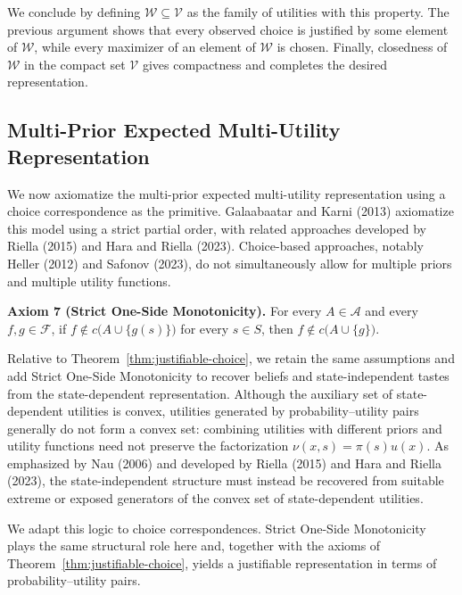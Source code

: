 \documentclass[11pt]{article}
\begin{document}
We conclude by defining $\mathcal W\subseteq\mathcal V$ as the family of utilities with this property. The previous argument shows that every observed choice is justified by some element of $\mathcal W$, while every maximizer of an element of $\mathcal W$ is chosen. Finally, closedness of $\mathcal W$ in the compact set $\mathcal V$ gives compactness and completes the desired representation.

\subsection{Multi-Prior Expected Multi-Utility Representation}

We now axiomatize the multi-prior expected multi-utility representation
using a choice correspondence as the primitive. Galaabaatar and Karni
(2013) axiomatize this model using a strict partial order, with related
approaches developed by Riella (2015) and Hara and Riella (2023).
Choice-based approaches, notably Heller (2012) and Safonov (2023), do not
simultaneously allow for multiple priors and multiple utility functions.

\medskip
\noindent\textbf{Axiom 7 (Strict One-Side Monotonicity).} For every $A\in\mathcal{A}$ and every $f,g\in\mathcal{F}$, if $f\notin c\bigl(A\cup\{g(s)\}\bigr)$ for every $s\in S$, then $f\notin c\bigl(A\cup\{g\}\bigr)$.

\medskip
Relative to Theorem~\ref{thm:justifiable-choice}, we retain the same assumptions and add Strict One-Side
Monotonicity to recover beliefs and state-independent tastes from the
state-dependent representation. Although the auxiliary set of
state-dependent utilities is convex, utilities generated by
probability--utility pairs generally do not form a convex set: combining
utilities with different priors and utility functions need not preserve the
factorization $\nu(x,s)=\pi(s)u(x)$. As emphasized by Nau (2006) and
developed by Riella (2015) and Hara and Riella (2023), the state-independent
structure must instead be recovered from suitable extreme or exposed
generators of the convex set of state-dependent utilities.

We adapt this logic to choice correspondences. Strict One-Side Monotonicity plays
the same structural role here and, together with the axioms of Theorem~\ref{thm:justifiable-choice},
yields a justifiable representation in terms of
probability--utility pairs.
\end{document}
